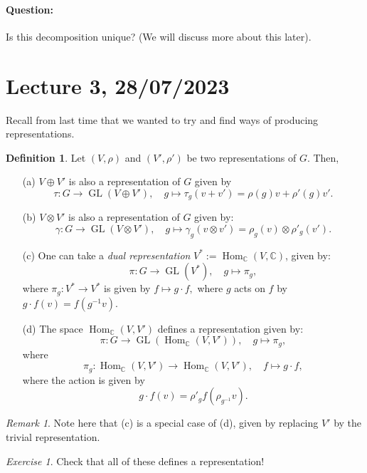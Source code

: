\documentclass[a4paper]{report}
\theoremstyle{definition}
\newtheorem{definition}{Definition}
\theoremstyle{remark}
\newtheorem{remark}{Remark}
\theoremstyle{proposition}
\theoremstyle{conjecture}
\theoremstyle{lemma}
\theoremstyle{corollary}
\theoremstyle{exercise}
\newtheorem{exercise}{Exercise}
\theoremstyle{example}
\newcommand{\C}{\mathbb{C}}
\newcommand{\on}{\operatorname}
\begin{document}
\paragraph{Question:} Is this decomposition unique? (We will discuss more 
about this later).

\section{Lecture 3, 28/07/2023}

Recall from last time that we wanted to try and find ways of producing 
representations. 
\begin{definition}
    Let $(V,\rho)$ and $(V',\rho')$ be two representations of $G$. 
    Then, 
    \begin{itemize}
        \item[(a)] $V\oplus V'$ is also a representation of $G$ given by 
            $$\tau : G \longrightarrow \on{GL}(V\oplus V'), \quad g \longmapsto 
            \tau_g(v+v') = \rho(g)v + \rho'(g)v'.$$
        \item[(b)] $V\otimes V'$ is also a representation of $G$ given by:
            $$\gamma : G \longrightarrow \on{GL}(V\otimes V'), \quad 
            g\longmapsto \gamma_g(v\otimes v') = \rho_g(v) \otimes \rho'_g(v').$$
        \item[(c)] One can take a \emph{dual representation}
            $V^\ast := \on{Hom}_\C(V,\C)$, given by:
            $$\pi : G \longrightarrow \on{GL}(V^\ast), \quad g \longmapsto\pi_g,$$
            where $\pi_g : V^\ast \to V^\ast$ is given by $f\mapsto g\cdot f,$
            where $g$ acts on $f$ by $g\cdot f(v) = f(g^{-1}v)$.
        \item[(d)] The space $\on{Hom}_\C(V,V')$ defines a representation
            given by: 
            $$\pi : G \longrightarrow \on{GL}(\on{Hom}_\C(V,V')), \quad 
            g\longmapsto \pi_g,$$
            where $$\pi_g : \on{Hom}_\C(V,V') \longrightarrow \on{Hom}_\C(V,V'),\quad f\longmapsto g\cdot f,$$
            where the action is given by $$g\cdot f(v) = \rho'_gf(\rho_{g^{-1}}v).$$
    \end{itemize}
\end{definition}

\begin{remark}
    Note here that (c) is a special case of (d), given by replacing 
    $V'$ by the trivial representation.
\end{remark}
\begin{exercise}
    Check that all of these defines a representation!
\end{exercise}
\end{document}
